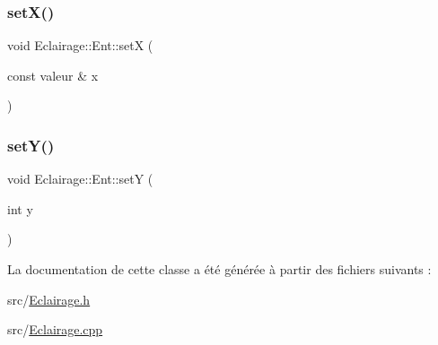 \mbox{\label{classEclairage_1_1Ent_a4803c876b2dc4ca8b85542261aae7bb1}} 
\subsubsection{\texorpdfstring{set\+X()}{setX()}}
{\footnotesize\ttfamily void Eclairage\+::\+Ent\+::setX (\begin{DoxyParamCaption}\item[{const valeur \&}]{x }\end{DoxyParamCaption})}

\mbox{\label{classEclairage_1_1Ent_abdf5e31d5b5788c832b964c3712b7231}} 
\subsubsection{\texorpdfstring{set\+Y()}{setY()}}
{\footnotesize\ttfamily void Eclairage\+::\+Ent\+::setY (\begin{DoxyParamCaption}\item[{int}]{y }\end{DoxyParamCaption})}



La documentation de cette classe a été générée à partir des fichiers suivants \+:\begin{DoxyCompactItemize}
\item 
src/\hyperlink{Eclairage_8h}{Eclairage.\+h}\item 
src/\hyperlink{Eclairage_8cpp}{Eclairage.\+cpp}\end{DoxyCompactItemize}
